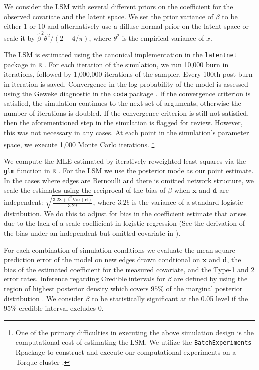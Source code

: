 \documentclass[11pt]{article}
\newcommand{\R}{\textsf{R}\space} %
\begin{document}
We consider the LSM with several different priors on the coefficient for the observed covariate and the latent space. We set the prior variance of $\beta$ to be either $1$ or $10$ and alternatively use a diffuse normal prior on the latent space or scale it by $\hat{\beta}^2\theta^2/(2-4/\pi)$, where $\theta^2$ is the empirical variance of $x$.

The LSM is estimated using the canonical implementation in the \texttt{latentnet} package in \texttt{R} \citep{latentnet}. For each iteration of the simulation, we run 10,000 burn in iterations, followed by 1,000,000 iterations of the sampler. Every 100th post burn in iteration is saved. Convergence in the log probability of the model is assessed using the Geweke diagnostic in the \texttt{coda} package \citep{coda, geweke1991evaluating}. If the convergence criterion is satisfied, the simulation continues to the next set of arguments, otherwise the number of iterations is doubled. If the convergence criterion is still not satisfied, then the aforementioned step in the simulation is flagged for review. However, this was not necessary in any cases. At each point in the simulation's parameter space, we execute 1,000 Monte Carlo iterations. \footnote{One of the primary difficulties in executing the above simulation design is the computational cost of estimating the LSM. We utilize the \texttt{BatchExperiments} \R package to construct and execute our computational experiments on a Torque cluster \cite{bischl2015batchjobs}.}

We compute the MLE estimated by iteratively reweighted least squares via the \texttt{glm} function in \texttt{R} \citep{rcore}. For the LSM we use the posterior mode as our point estimate. In the cases where edges are Bernoulli and there is omitted network structure, we scale the estimates using the reciprocal of the bias of $\beta$ when $\mathbf{x}$ and $\mathbf{d}$ are independent: $\sqrt{\frac{3.28 + \beta^2 \text{Var}(\mathbf{d})}{3.29}}$, where $3.29$ is the variance of a standard logistic distribution. We do this to adjust for bias in the coefficient estimate that arises due to the lack of a scale coefficient in logistic regression (See the derivation of the bias under an independent but omitted covariate in \cite{mood2010logistic}).

For each combination of simulation conditions we evaluate the mean square prediction error of the model on new edges drawn condtional on $\mathbf{x}$ and $\mathbf{d}$, the bias of the estimated coefficient for the measured covariate, and the Type-1 and 2 error rates. Inference regarding Credible intervals for $\beta$ are defined by using the region of highest posterior density which covers $95\%$ of the marginal posterior distribution \cite{turkkan1993computation}. We consider $\beta$ to be statistically significant at the 0.05 level if the 95\% credible interval excludes 0.
\end{document}
